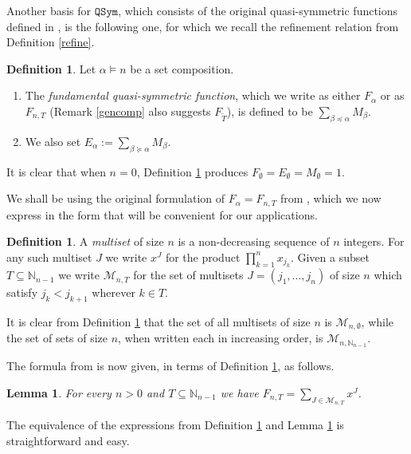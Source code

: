 \documentclass{article}
\newtheorem{lem}[thm]{Lemma}
\theoremstyle{definition}
\newtheorem{defn}[thm]{Definition}
\begin{document}
\medskip

Another basis for $\mathtt{QSym}$, which consists of the original quasi-symmetric functions defined in \cite{[Ge]}, is the following one, for which we recall the refinement relation from Definition \ref{refine}.
\begin{defn}
Let $\alpha \vDash n$ be a set composition.
\begin{enumerate}[$(i)$]
\item The \emph{fundamental quasi-symmetric function}, which we write as either $F_{\alpha}$ or as $F_{n,T}$ (Remark \ref{gencomp} also suggests $F_{\tilde{T}}$), is defined to be $\sum_{\beta\preceq\alpha}M_{\beta}$.
\item We also set $E_{\alpha}:=\sum_{\beta\succeq\alpha}M_{\beta}$.
\end{enumerate} \label{fundQSym}
\end{defn}
It is clear that when $n=0$, Definition \ref{fundQSym} produces $F_{\emptyset}=E_{\emptyset}=M_{\emptyset}=1$.

We shall be using the original formulation of $F_{\alpha}=F_{n,T}$ from \cite{[Ge]}, which we now express in the form that will be convenient for our applications.
\begin{defn}
A \emph{multiset} of size $n$ is a non-decreasing sequence of $n$ integers. For any such multiset $J$ we write $x^{J}$ for the product $\prod_{k=1}^{n}x_{j_{k}}$. Given a subset $T\subseteq\mathbb{N}_{n-1}$ we write $\mathcal{M}_{n,T}$ for the set of multisets $J=(j_{1},\ldots,j_{n})$ of size $n$ which satisfy $j_{k}<j_{k+1}$ wherever $k \in T$. \label{multisets}
\end{defn}
It is clear from Definition \ref{multisets} that the set of all multisets of size $n$ is $\mathcal{M}_{n,\emptyset}$, while the set of sets of size $n$, when written each in increasing order, is $\mathcal{M}_{n,\mathbb{N}_{n-1}}$.

The formula from \cite{[Ge]} is now given, in terms of Definition \ref{multisets}, as follows.
\begin{lem}
For every $n>0$ and $T\subseteq\mathbb{N}_{n-1}$ we have $F_{n,T}=\sum_{J\in\mathcal{M}_{n,T}}x^{J}$. \label{sumFnT}
\end{lem}
The equivalence of the expressions from Definition \ref{fundQSym} and Lemma \ref{sumFnT} is straightforward and easy.

\medskip
\end{document}
